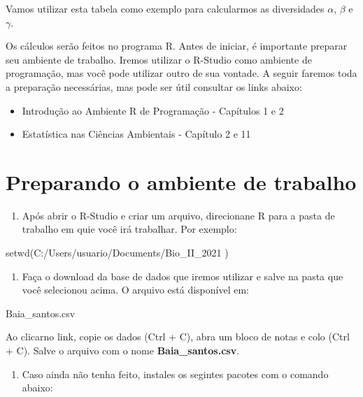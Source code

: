\documentclass[
]{book}
\newenvironment{Shaded}{\begin{snugshade}}{\end{snugshade}}
\newcommand{\FunctionTok}[1]{\textcolor[rgb]{0.00,0.00,0.00}{#1}}
\newcommand{\NormalTok}[1]{#1}
\newcommand{\StringTok}[1]{\textcolor[rgb]{0.31,0.60,0.02}{#1}}
\providecommand{\tightlist}{%
  \setlength{\itemsep}{0pt}\setlength{\parskip}{0pt}}
\begin{document}
Vamos utilizar esta tabela como exemplo para calcularmos as diversidades \(\alpha\), \(\beta\) e \(\gamma\).

Os cálculos serão feitos no programa R. Antes de iniciar, é importante preparar seu ambiente de trabalho. Iremos utilizar o R-Studio como ambiente de programação, mas você pode utilizar outro de sua vontade. A seguir faremos toda a preparação necessárias, mas pode ser útil consultar os links abaixo:

\begin{itemize}
\item
  Introdução ao Ambiente R de Programação - Capítulos 1 e 2
\item
  Estatística nas Ciências Ambientais - Capítulo 2 e 11
\end{itemize}

\hypertarget{preparando-o-ambiente-de-trabalho}{%
\section{Preparando o ambiente de trabalho}\label{preparando-o-ambiente-de-trabalho}}

\begin{enumerate}
\def\labelenumi{\arabic{enumi}.}
\tightlist
\item
  Após abrir o R-Studio e criar um arquivo, direcionane R para a pasta de trabalho em quie você irá trabalhar. Por exemplo:
\end{enumerate}

\begin{Shaded}
\begin{Highlighting}[]
\FunctionTok{setwd}\NormalTok{(}\StringTok{\textquotesingle{}C:/Users/usuario/Documents/Bio\_II\_2021\textquotesingle{}}\NormalTok{ )}
\end{Highlighting}
\end{Shaded}

\begin{enumerate}
\def\labelenumi{\arabic{enumi}.}
\setcounter{enumi}{1}
\tightlist
\item
  Faça o download da base de dados que iremos utilizar e salve na pasta que você selecionou acima. O arquivo está disponível em:
\end{enumerate}

Baia\_santos.csv

Ao clicarno link, copie os dados (Ctrl + C), abra um bloco de notas e colo (Ctrl + C). Salve o arquivo com o nome \textbf{Baia\_santos.csv}.

\begin{enumerate}
\def\labelenumi{\arabic{enumi}.}
\setcounter{enumi}{2}
\tightlist
\item
  Caso ainda não tenha feito, instales os segintes pacotes com o comando abaixo:
\end{enumerate}
\end{document}
